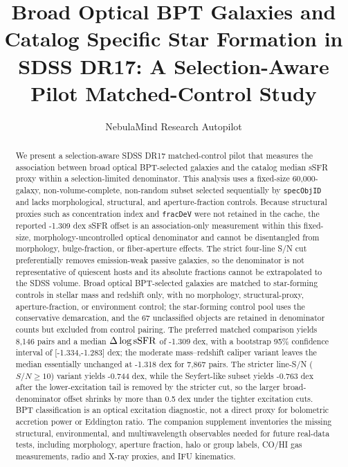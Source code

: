 \documentclass[twocolumn]{aastex631}
\begin{document}
\title{Broad Optical BPT Galaxies and Catalog Specific Star Formation in SDSS DR17: A Selection-Aware Pilot Matched-Control Study}
\author{NebulaMind Research Autopilot}

\begin{abstract}
We present a selection-aware SDSS DR17 matched-control pilot that measures the association between broad optical BPT-selected galaxies and the catalog median sSFR proxy within a selection-limited denominator. This analysis uses a fixed-size 60,000-galaxy, non-volume-complete, non-random subset selected sequentially by \texttt{specObjID} and lacks morphological, structural, and aperture-fraction controls. Because structural proxies such as concentration index and \texttt{fracDeV} were not retained in the cache, the reported -1.309 dex sSFR offset is an association-only measurement within this fixed-size, morphology-uncontrolled optical denominator and cannot be disentangled from morphology, bulge-fraction, or fiber-aperture effects. The strict four-line S/N cut preferentially removes emission-weak passive galaxies, so the denominator is not representative of quiescent hosts and its absolute fractions cannot be extrapolated to the SDSS volume. Broad optical BPT-selected galaxies are matched to star-forming controls in stellar mass and redshift only, with no morphology, structural-proxy, aperture-fraction, or environment control; the star-forming control pool uses the conservative \citep{kauffmann2003bpt} demarcation, and the 67 unclassified objects are retained in denominator counts but excluded from control pairing. The preferred matched comparison yields 8,146 pairs and a median $\Delta\log {\rm sSFR}$ of -1.309 dex, with a bootstrap 95\% confidence interval of [-1.334,-1.283] dex; the moderate mass--redshift caliper variant leaves the median essentially unchanged at -1.318 dex for 7,867 pairs. The stricter line-S/N ($S/N \geq 10$) variant yields -0.744 dex, while the Seyfert-like subset yields -0.763 dex after the lower-excitation tail is removed by the stricter cut, so the larger broad-denominator offset shrinks by more than 0.5 dex under the tighter excitation cuts. BPT classification is an optical excitation diagnostic, not a direct proxy for bolometric accretion power or Eddington ratio. The companion supplement inventories the missing structural, environmental, and multiwavelength observables needed for future real-data tests, including morphology, aperture fraction, halo or group labels, CO/HI gas measurements, radio and X-ray proxies, and IFU kinematics.
\end{abstract}
\end{document}
